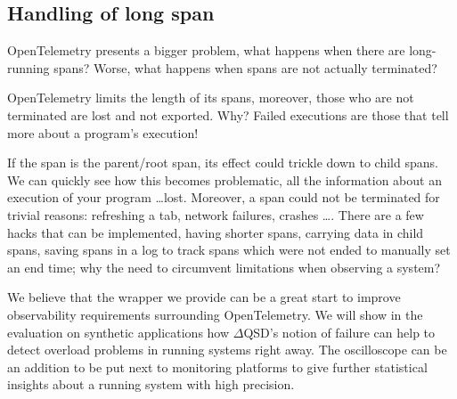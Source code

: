     \subsection{Handling of long span}
        OpenTelemetry presents a bigger problem, what happens when there are long-running spans? Worse, what happens when spans are not actually terminated?
        
        OpenTelemetry limits the length of its spans, moreover, those who are not terminated are lost and not exported. Why? Failed executions are those that tell more about a program's execution!

        If the span is the parent/root span, its effect could trickle down to child spans. We can quickly see how this becomes problematic, all the information about an execution of your program \dots lost. Moreover, a span could not be terminated for trivial reasons: refreshing a tab, network failures, crashes \dots \cite{otel-l}. There are a few hacks that can be implemented, having shorter spans, carrying data in child spans, saving spans in a log to track spans which were not ended to manually set an end time; why the need to circumvent limitations when observing a system?

     We believe that the wrapper we provide can be a great start to improve observability requirements surrounding OpenTelemetry. We will show in the evaluation on synthetic applications how $\Delta$QSD's notion of failure can help to detect overload problems in running systems right away. The oscilloscope can be an addition to be put next to monitoring platforms to give further statistical insights about a running system with high precision.
